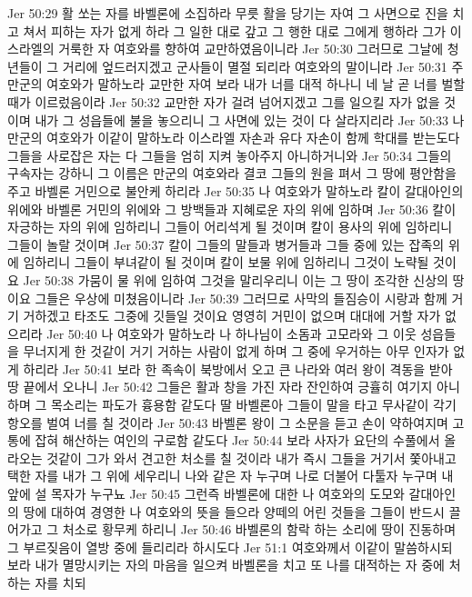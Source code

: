 Jer 50:29  활 쏘는 자를 바벨론에 소집하라 무릇 활을 당기는 자여 그 사면으로 진을 치고 쳐서 피하는 자가 없게 하라 그 일한 대로 갚고 그 행한 대로 그에게 행하라 그가 이스라엘의 거룩한 자 여호와를 향하여 교만하였음이니라
Jer 50:30  그러므로 그날에 청년들이 그 거리에 엎드러지겠고 군사들이 멸절 되리라 여호와의 말이니라
Jer 50:31  주 만군의 여호와가 말하노라 교만한 자여 보라 내가 너를 대적 하나니 네 날 곧 너를 벌할 때가 이르렀음이라
Jer 50:32  교만한 자가 걸려 넘어지겠고 그를 일으킬 자가 없을 것이며 내가 그 성읍들에 불을 놓으리니 그 사면에 있는 것이 다 살라지리라
Jer 50:33  나 만군의 여호와가 이같이 말하노라 이스라엘 자손과 유다 자손이 함께 학대를 받는도다 그들을 사로잡은 자는 다 그들을 엄히 지켜 놓아주지 아니하거니와
Jer 50:34  그들의 구속자는 강하니 그 이름은 만군의 여호와라 결코 그들의 원을 펴서 그 땅에 평안함을 주고 바벨론 거민으로 불안케 하리라
Jer 50:35  나 여호와가 말하노라 칼이 갈대아인의 위에와 바벨론 거민의 위에와 그 방백들과 지혜로운 자의 위에 임하며
Jer 50:36  칼이 자긍하는 자의 위에 임하리니 그들이 어리석게 될 것이며 칼이 용사의 위에 임하리니 그들이 놀랄 것이며
Jer 50:37  칼이 그들의 말들과 병거들과 그들 중에 있는 잡족의 위에 임하리니 그들이 부녀같이 될 것이며 칼이 보물 위에 임하리니 그것이 노략될 것이요
Jer 50:38  가뭄이 물 위에 임하여 그것을 말리우리니 이는 그 땅이 조각한 신상의 땅이요 그들은 우상에 미쳤음이니라
Jer 50:39  그러므로 사막의 들짐승이 시랑과 함께 거기 거하겠고 타조도 그중에 깃들일 것이요 영영히 거민이 없으며 대대에 거할 자가 없으리라
Jer 50:40  나 여호와가 말하노라 나 하나님이 소돔과 고모라와 그 이웃 성읍들을 무너지게 한 것같이 거기 거하는 사람이 없게 하며 그 중에 우거하는 아무 인자가 없게 하리라
Jer 50:41  보라 한 족속이 북방에서 오고 큰 나라와 여러 왕이 격동을 받아 땅 끝에서 오나니
Jer 50:42  그들은 활과 창을 가진 자라 잔인하여 긍휼히 여기지 아니하며 그 목소리는 파도가 흉용함 같도다 딸 바벨론아 그들이 말을 타고 무사같이 각기 항오를 벌여 너를 칠 것이라
Jer 50:43  바벨론 왕이 그 소문을 듣고 손이 약하여지며 고통에 잡혀 해산하는 여인의 구로함 같도다
Jer 50:44  보라 사자가 요단의 수풀에서 올라오는 것같이 그가 와서 견고한 처소를 칠 것이라 내가 즉시 그들을 거기서 쫓아내고 택한 자를 내가 그 위에 세우리니 나와 같은 자 누구며 나로 더불어 다툴자 누구며 내 앞에 설 목자가 누구뇨
Jer 50:45  그런즉 바벨론에 대한 나 여호와의 도모와 갈대아인의 땅에 대하여 경영한 나 여호와의 뜻을 들으라 양떼의 어린 것들을 그들이 반드시 끌어가고 그 처소로 황무케 하리니
Jer 50:46  바벨론의 함락 하는 소리에 땅이 진동하며 그 부르짖음이 열방 중에 들리리라 하시도다
Jer 51:1  여호와께서 이같이 말씀하시되 보라 내가 멸망시키는 자의 마음을 일으켜 바벨론을 치고 또 나를 대적하는 자 중에 처하는 자를 치되
